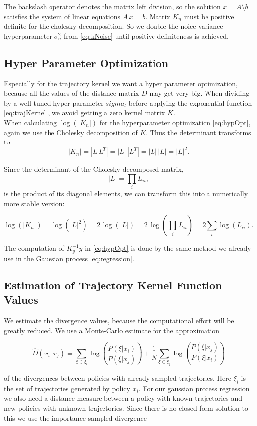 The backslash operator denotes the matrix left division, so the solution $x=A\setminus b$ satisfies the system of linear equations $A\,x=b$.
Matrix $K_n$ must be positive definite for the cholesky decomposition. So we double the noice variance hyperparameter $\sigma_n^2$ from \eqref{eq:kNoise} until positive definiteness is achieved.

\subsection{Hyper Parameter Optimization}
Especially for the trajectory kernel we want a hyper parameter optimization, because all the values of the distance matrix $D$ may get very big. When dividing by a well tuned hyper parameter $sigma_l$ before applying the exponential function \eqref{eq:trajKernel}, we avoid getting a zero kernel matrix $K$.\\

When calculating $\log(|K_n|)$ for the hyperparameter optimization \eqref{eq:hypOpt}, again we use the Cholesky decomposition of $K$. Thus the determinant transforms to
$$|K_n|=|L\,L^{T}|=|L|\,|L^{T}|=|L|\,|L|=|L|^{2}.$$

Since the determinant of the Cholesky decomposed matrix,
$$|L| = \textstyle\prod_{i} L_{ii},$$
is the product of its diagonal elements, we can transform this into a numerically more stable version:

$$\log(|K_n|) = \log(|L|^{2}) = 2\,\log(|L|) = 2\,\log(\textstyle\prod_{i} L_{ii}) = 2\textstyle\sum_{i} \log(L_{ii}).$$

The computation of $K_y^{-1}y$ in \eqref{eq:hypOpt} is done by the same method we already use in the Gaussian process \eqref{eq:regression}.

\subsection{Estimation of Trajectory Kernel Function Values}

We estimate the divergence values, because the computational effort will be greatly reduced\cite{wilson2014using}. We use a Monte-Carlo estimate for the approximation

$$\hat{D}(x_{ i }, x_{ j }) = \sum _{\xi \in \xi_i} \log\left( \frac{P(\xi|x_{ i })}{P(\xi|x_{ j })} \right) + \frac{1}{N}\sum _{\xi \in \xi_j} \log\left( \frac{P(\xi|x_{ j })}{P(\xi|x_{ i })} \right) $$

of the divergences between policies with already sampled trajectories. Here $\xi_i$ is the set of trajectories generated by policy $x_i$. For our gaussian process regression we also need a distance measure between a policy with known trajectories and new policies with unknown trajectories. Since there is no closed form solution to this we use the importance sampled divergence

